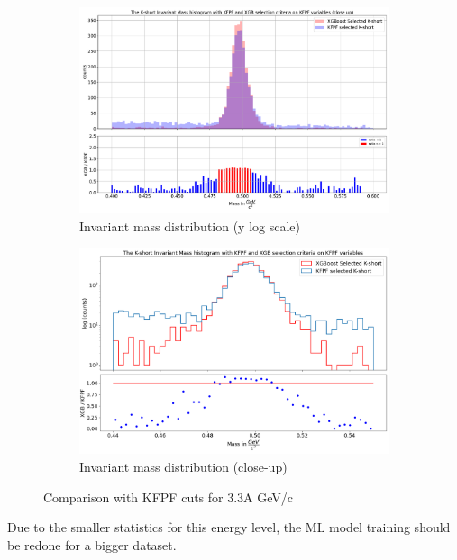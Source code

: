 \documentclass[12pt,a4paper]{report}
\begin{document}
\begin{figure}[h!]
 \centering
    \begin{subfigure}[b]{0.99\linewidth} 
        \centering
        \includegraphics[width=\textwidth]{images/kaon_inv_mass_comparison_closeup.pdf} 
        \caption{Invariant mass distribution (y log scale)} 
        \vspace{0.3cm}
    \end{subfigure}
     \hfill
       \begin{subfigure}[b]{0.99\linewidth}
        \centering
        \includegraphics[width=\textwidth]{images/circle_kshort_invmass_with_ML.png} 
        \caption{Invariant mass distribution (close-up)}
        \vspace{0.3cm}
    \end{subfigure}
    \caption{Comparison with KFPF cuts for 3.3A GeV/c}\label{33agev}
\end{figure}
Due to the smaller statistics for this energy level, the ML model training should be redone for a bigger dataset.
\end{document}
